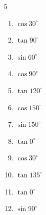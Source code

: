 \begin{multicols}{5}
\begin{enumerate}
        \phantom{$\displaystyle =0$}

  \item $\displaystyle \cos{30^\circ}$


  \item $\displaystyle \tan{90^\circ}$

        \phantom{$\displaystyle なし$}

  \item $\displaystyle \sin{60^\circ}$


  \item $\displaystyle \cos{90^\circ}$

        \phantom{$\displaystyle =0$}

  \item $\displaystyle \tan{120^\circ}$


  \item $\displaystyle \cos{150^\circ}$


  \item $\displaystyle \sin{150^\circ}$


  \item $\displaystyle \tan{0^\circ}$

        \phantom{$\displaystyle =0$}

  \item $\displaystyle \cos{30^\circ}$


  \item $\displaystyle \tan{135^\circ}$

        \phantom{$\displaystyle =-1$}

  \item $\displaystyle \tan{0^\circ}$

        \phantom{$\displaystyle =0$}

\columnbreak %

\resetques

  \item $\displaystyle \sin{90^\circ}$

        \phantom{$\displaystyle =1$}


\end{enumerate}
\end{multicols}
